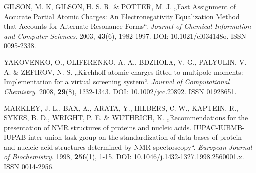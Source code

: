 \begin{thebibliography}{10}
GILSON, M. K, GILSON, H. S. R. \& POTTER, M. J. „Fast Assignment of Accurate Partial Atomic Charges: An Electronegativity Equalization Method that Accounts for Alternate Resonance Forms“. \textit{Journal of Chemical Information and Computer Sciences}. 2003, \textbf{43}(6), 1982-1997. DOI: 10.1021/ci034148o. ISSN 0095-2338.

YAKOVENKO, O., OLIFERENKO, A. A., BDZHOLA, V. G., PALYULIN, V. A. \& ZEFIROV, N. S. „Kirchhoff atomic charges fitted to multipole moments: Implementation for a virtual screening system“. \textit{Journal of Computational Chemistry}. 2008, \textbf{29}(8), 1332-1343. DOI: 10.1002/jcc.20892. ISSN 01928651.

MARKLEY, J. L., BAX, A., ARATA, Y., HILBERS, C. W.,  KAPTEIN, R., SYKES, B. D., WRIGHT, P. E. \& WUTHRICH, K. „Recommendations for the presentation of NMR structures of proteins and nucleic acids. IUPAC-IUBMB-IUPAB inter-union task group on the standardization of data bases of protein and nucleic acid structures determined by NMR spectroscopy“. \textit{European Journal of Biochemistry}. 1998, \textbf{256}(1), 1-15. DOI: 10.1046/j.1432-1327.1998.2560001.x. ISSN 0014-2956. 

\end{thebibliography}


\cleardoublepage
